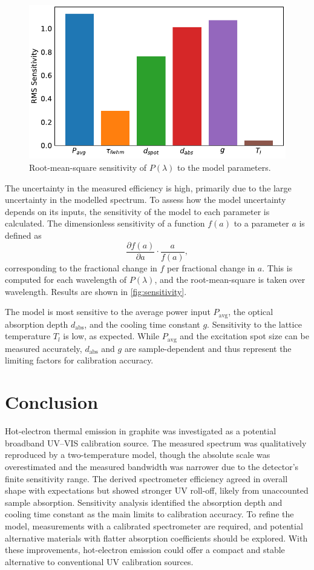 \documentclass[
	parskip=half,
	a4paper,
]{scrarticle}
\begin{document}
\begin{figure}
    \centering
    \includegraphics{../analysis/figures/sensitivity bars.pdf}
    \caption{Root-mean-square sensitivity of \(P(\lambda)\) to the model parameters.}
    \label{fig:sensitivity}
\end{figure}
The uncertainty in the measured efficiency is high, primarily due to the large uncertainty in the modelled spectrum. To assess how the model uncertainty depends on its inputs, the sensitivity of the model to each parameter is calculated. The dimensionless sensitivity of a function \(f(a)\) to a parameter \(a\) is defined as
\[
\frac{\partial f(a)}{\partial a} \cdot \frac{a}{f(a)},
\]
corresponding to the fractional change in \(f\) per fractional change in \(a\). This is computed for each wavelength of \(P(\lambda)\), and the root-mean-square is taken over wavelength. Results are shown in \autoref{fig:sensitivity}.

The model is most sensitive to the average power input \(P_\text{avg}\), the optical absorption depth \(d_\text{abs}\), and the cooling time constant \(g\). Sensitivity to the lattice temperature \(T_l\) is low, as expected. While \(P_\text{avg}\) and the excitation spot size can be measured accurately, \(d_\text{abs}\) and \(g\) are sample-dependent and thus represent the limiting factors for calibration accuracy.

\section{Conclusion}
Hot-electron thermal emission in graphite was investigated as a potential broadband UV–VIS calibration source. The measured spectrum was qualitatively reproduced by a two-temperature model, though the absolute scale was overestimated and the measured bandwidth was narrower due to the detector’s finite sensitivity range. The derived spectrometer efficiency agreed in overall shape with expectations but showed stronger UV roll-off, likely from unaccounted sample absorption. Sensitivity analysis identified the absorption depth and cooling time constant as the main limits to calibration accuracy. To refine the model, measurements with a calibrated spectrometer are required, and potential alternative materials with flatter absorption coefficients should be explored. With these improvements, hot-electron emission could offer a compact and stable alternative to conventional UV calibration sources.


\printbibliography
\end{document}
